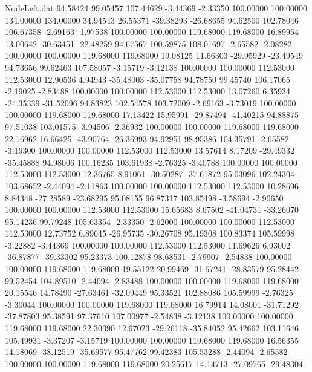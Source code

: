 \begin{filecontents}{NodeLeft.dat}
  94.58424   99.05457  107.44629    -3.44369   -2.33350  100.00000  100.00000  134.00000  134.00000   34.94543   26.55371  -39.38293  -26.68655
  94.62500  102.78046  106.67358    -2.69163   -1.97538  100.00000  100.00000  119.68000  119.68000   16.89954   13.00642  -30.63451  -22.48259
  94.67567  100.59875  108.01697    -2.65582   -2.08282  100.00000  100.00000  119.68000  119.68000   19.08125   11.66303  -29.95929  -23.49549
  94.73656   99.62463  107.58057    -3.15719   -3.12138  100.00000  100.00000  112.53000  112.53000   12.90536    4.94943  -35.48003  -35.07758
  94.78750   99.45740  106.17065    -2.19025   -2.83488  100.00000  100.00000  112.53000  112.53000   13.07260    6.35934  -24.35339  -31.52096
  94.83823  102.54578  103.72009    -2.69163   -3.73019  100.00000  100.00000  119.68000  119.68000   17.13422   15.95991  -29.87494  -41.40215
  94.88875   97.51038  103.01575    -3.94506   -2.36932  100.00000  100.00000  119.68000  119.68000   22.16962   16.66425  -43.90764  -26.36993
  94.92951   98.95386  104.35791    -2.65582   -3.19300  100.00000  100.00000  112.53000  112.53000   13.57614    8.17209  -29.49332  -35.45888
  94.98006  100.16235  103.61938    -2.76325   -3.40788  100.00000  100.00000  112.53000  112.53000   12.36765    8.91061  -30.50287  -37.61872
  95.03096  102.24304  103.68652    -2.44094   -2.11863  100.00000  100.00000  112.53000  112.53000   10.28696    8.84348  -27.28589  -23.68295
  95.08155   96.87317  103.85498    -3.58694   -2.90650  100.00000  100.00000  112.53000  112.53000   15.65683    8.67502  -41.04731  -33.26070
  95.14236   99.79248  105.63354    -2.33350   -2.62000  100.00000  100.00000  112.53000  112.53000   12.73752    6.89645  -26.95735  -30.26708
  95.19308  100.83374  105.59998    -3.22882   -3.44369  100.00000  100.00000  112.53000  112.53000   11.69626    6.93002  -36.87877  -39.33302
  95.23373  100.12878   98.68531    -2.79907   -2.54838  100.00000  100.00000  119.68000  119.68000   19.55122   20.99469  -31.67241  -28.83579
  95.28442   99.52454  104.89510    -2.44094   -2.83488  100.00000  100.00000  119.68000  119.68000   20.15546   14.78490  -27.63461  -32.09449
  95.33521  102.88086  105.59999    -2.76325   -3.30044  100.00000  100.00000  119.68000  119.68000   16.79914   14.08001  -31.71292  -37.87803
  95.38591   97.37610  107.00977    -2.54838   -3.12138  100.00000  100.00000  119.68000  119.68000   22.30390   12.67023  -29.26118  -35.84052
  95.42662  103.11646  105.49931    -3.37207   -3.15719  100.00000  100.00000  119.68000  119.68000   16.56355   14.18069  -38.12519  -35.69577
  95.47762   99.42383  105.53288    -2.44094   -2.65582  100.00000  100.00000  119.68000  119.68000   20.25617   14.14713  -27.09765  -29.48304

\end{filecontents}
